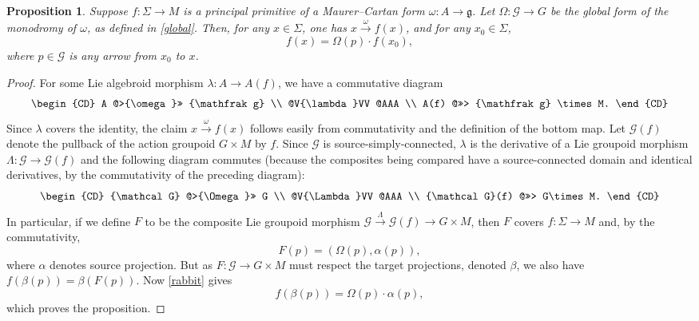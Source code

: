 \documentclass[10pt,a4paper]{amsart}
\numberwithin{equation}{section}
\newtheorem{Proposition}[Theorem]{Proposition}
\begin{document}
\begin{Proposition}\label{uniquenessP}
 Suppose $f \colon \Sigma \rightarrow M$ is a principal primitive of
 a Maurer--Cartan form $\omega \colon A \rightarrow {\mathfrak g} $.
 Let $\Omega \colon {\mathcal G} \rightarrow G$ be the global form of
 the monodromy of $\omega $, as defined in \eqref{global}. Then, for
 any $x \in \Sigma $, one has $x\xrightarrow{\omega}f(x)$, and for
 any $x_0\in \Sigma $,
 \begin{equation*} f(x)=\Omega(p)\cdot f(x_0),
 \end{equation*} where $p \in {\mathcal G} $ is any arrow from $x_0$
to $x$.
\end{Proposition}
\begin{proof} For some Lie algebroid morphism $\lambda \colon A
\rightarrow A(f)$, we have a commutative diagram
 \begin{equation*}
 \begin{CD} A @>{\omega }>> {\mathfrak g} \\ @V{\lambda}VV @AAA \\
A(f) @>>> {\mathfrak g} \times M.
 \end{CD}
 \end{equation*}
 Since $\lambda$ covers the identity, the claim
$x\xrightarrow{\omega}f(x)$ follows easily from commutativity and the
definition of the bottom map. Let ${\mathcal G}(f)$ denote the
pullback of the action groupoid $G \times M$ by $f$. Since ${\mathcal
G} $ is source-simply-connected, $\lambda$ is the derivative of a Lie
groupoid morphism $\Lambda \colon {\mathcal G} \rightarrow {\mathcal
G}(f)$ and the following diagram commutes (because the composites
being compared have a source-connected domain and identical
derivatives, by the commutativity of the preceding diagram):
 \begin{equation*}
 \begin{CD} {\mathcal G} @>{\Omega }>> G \\ @V{\Lambda}VV @AAA \\
{\mathcal G}(f) @>>> G\times M.
 \end{CD}
 \end{equation*}
 In particular, if we define $F$ to be the composite
Lie groupoid morphism ${\mathcal G}\xrightarrow{\Lambda}{\mathcal
G}(f)\rightarrow G \times M$, then $F$ covers $f \colon \Sigma
\rightarrow M$ and, by the commutativity,
\begin{equation}
F(p)=(\Omega(p),\alpha(p)),\label{rabbit}
\end{equation} where $\alpha $ denotes source projection. But as $F
\colon {\mathcal G} \rightarrow G \times M$ must respect the target
projections, denoted $\beta$, we also have
$f(\beta(p))=\beta(F(p))$. Now \eqref{rabbit} gives
\begin{equation*} f(\beta(p))=\Omega(p) \cdot \alpha(p),
\end{equation*} which proves the proposition.
\end{proof}
%
\end{document}
